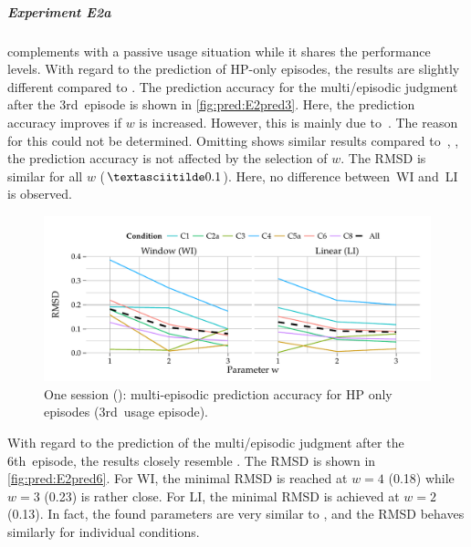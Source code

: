 \subparagraph*{Experiment E2a}
\EIIa{} complements  with a passive usage situation while it shares the performance levels.
With regard to the prediction of \ac{HP}-only episodes, the results are slightly different compared to .
The prediction accuracy for the multi\-/episodic judgment after the 3rd~episode is shown in \autoref{fig:pred:E2pred3}.
Here, the prediction accuracy improves if $\mathit{w}$ is increased.
However, this is mainly due to~.
The reason for this could not be determined.
Omitting  shows similar results compared to~, \ie, the prediction accuracy is not affected by the selection of $\mathit{w}$.
The \ac{RMSD} is similar for all $\mathit{w}$ ($\textasciitilde 0.1$).
Here, no difference between~WI and~LI is observed.

\begin{figure}[b]
	\centering
\begin{knitrout}
\color{fgcolor}
\includegraphics[width=\maxwidth]{figure/plotE2BASE-1} 

\end{knitrout}
	\caption[One session (\EIIa{}): multi-episodic prediction accuracy for the 3rd~usage episode (\acs{HP} only)]{One session (\EIIa{}): multi-episodic prediction accuracy for \acs{HP} only episodes (3rd~usage episode).}
	\label{fig:pred:E2pred3}
\end{figure}

With regard to the prediction of the multi\-/episodic judgment after the 6th~episode, the results closely resemble .
The \ac{RMSD} is shown in \autoref{fig:pred:E2pred6}.
For WI, the minimal \ac{RMSD} is reached at $\mathit{w}=4$ (0.18) while $\mathit{w}=3$ (0.23) is rather close.
For LI, the minimal \ac{RMSD} is achieved at $\mathit{w}=2$ (0.13).
In fact, the found parameters are very similar to , and the \ac{RMSD} behaves similarly for individual conditions.

